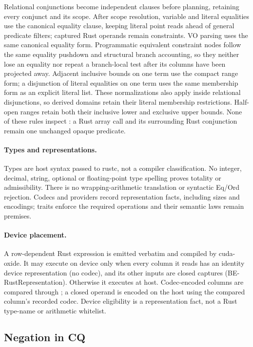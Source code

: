 Relational conjunctions become independent clauses before planning, retaining
every conjunct and its scope. After scope resolution, variable and literal
equalities use the canonical equality clause, keeping literal point reads
ahead of general predicate filters; captured Rust operands remain constraints.
VO parsing uses the same canonical equality form. Programmatic equivalent
constraint nodes follow the same equality pushdown and structural branch
accounting, so they neither lose an equality nor repeat a branch-local test
after its columns have been projected away.
Adjacent inclusive bounds on one term use the
compact range form; a disjunction of literal equalities on one term uses the
same membership form as an explicit literal list. These normalizations also
apply inside relational disjunctions, so derived domains retain their literal
membership restrictions. Half-open ranges retain both their inclusive lower
and exclusive upper bounds. None of these rules inspect : a Rust
array  call and its surrounding Rust conjunction remain one
unchanged opaque predicate.

\paragraph{Types and representations.}
Types are host syntax passed to rustc, not a compiler classification.
No integer, decimal, string, optional or floating-point type spelling proves
totality or admissibility. There is no wrapping-arithmetic translation or
syntactic Eq/Ord rejection. Codecs and providers record representation facts,
including sizes and encodings; traits enforce the required operations and
their semantic laws remain premises.

\paragraph{Device placement.}
A row-dependent Rust expression is emitted verbatim and compiled by
cuda-oxide. It may execute on device only when every column it reads has an
identity device representation (no codec), and its other inputs are closed
captures (BE-RustRepresentation). Otherwise it executes at host.
Codec-encoded columns are compared through ; a closed operand
is encoded on the host using the compared column's recorded codec.
Device eligibility is a representation fact, not a Rust type-name or
arithmetic whitelist.

\subsection{Negation in CQ}
